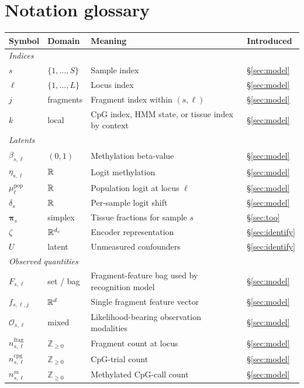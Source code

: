 \section{Notation glossary}
\label{app:glossary}
\begin{center}
\small
\begin{tabular}{llll}
\toprule
Symbol & Domain & Meaning & Introduced \\
\midrule
\multicolumn{4}{l}{\emph{Indices}} \\
$s$ & $\{1,\dots,S\}$ & Sample index & \S\ref{sec:model} \\
$\ell$ & $\{1,\dots,L\}$ & Locus index & \S\ref{sec:model} \\
$j$ & fragments & Fragment index within $(s,\ell)$ & \S\ref{sec:model} \\
$k$ & local & CpG index, HMM state, or tissue index by context & \S\ref{sec:model} \\
\midrule
\multicolumn{4}{l}{\emph{Latents}} \\
$\beta_{s,\ell}$ & $(0,1)$ & Methylation beta-value & \S\ref{sec:model} \\
$\eta_{s,\ell}$ & $\mathbb{R}$ & Logit methylation & \S\ref{sec:model} \\
$\mu^{\mathrm{pop}}_\ell$ & $\mathbb{R}$ & Population logit at locus $\ell$ & \S\ref{sec:model} \\
$\delta_s$ & $\mathbb{R}$ & Per-sample logit shift & \S\ref{sec:model} \\
$\bm\pi_s$ & simplex & Tissue fractions for sample $s$ & \S\ref{sec:too} \\
$\zeta$ & $\mathbb{R}^{d_c}$ & Encoder representation & \S\ref{sec:identify} \\
$U$ & latent & Unmeasured confounders & \S\ref{sec:identify} \\
\midrule
\multicolumn{4}{l}{\emph{Observed quantities}} \\
$F_{s,\ell}$ & set / bag & Fragment-feature bag used by recognition model & \S\ref{sec:model} \\
$f_{s,\ell,j}$ & $\mathbb{R}^d$ & Single fragment feature vector & \S\ref{sec:model} \\
$\mathcal{O}_{s,\ell}$ & mixed & Likelihood-bearing observation modalities & \S\ref{sec:model} \\
$n^{\mathrm{frag}}_{s,\ell}$ & $\mathbb{Z}_{\ge0}$ & Fragment count at locus & \S\ref{sec:model} \\
$n^{\mathrm{cpg}}_{s,\ell}$ & $\mathbb{Z}_{\ge0}$ & CpG-trial count & \S\ref{sec:model} \\
$n^m_{s,\ell}$ & $\mathbb{Z}_{\ge0}$ & Methylated CpG-call count & \S\ref{sec:model} \\

\end{tabular}
\end{center}
